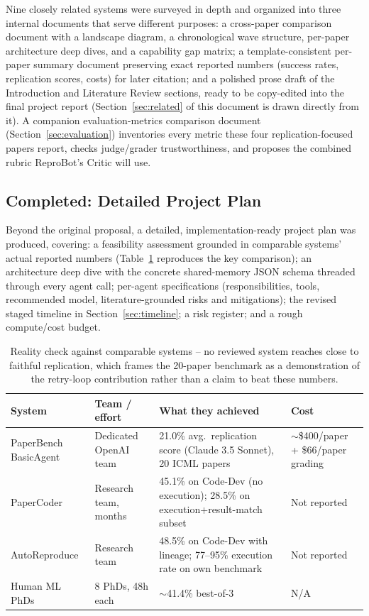 \documentclass[10pt,twocolumn]{article}
\begin{document}
Nine closely related systems were surveyed in depth and organized into three internal
documents that serve different purposes: a cross-paper comparison document with a
landscape diagram, a chronological wave structure, per-paper architecture deep dives,
and a capability gap matrix; a template-consistent per-paper summary document preserving
exact reported numbers (success rates, replication scores, costs) for later citation;
and a polished prose draft of the Introduction and Literature Review sections, ready to
be copy-edited into the final project report (Section~\ref{sec:related} of this document
is drawn directly from it). A companion evaluation-metrics comparison document
(Section~\ref{sec:evaluation}) inventories every metric these four replication-focused
papers report, checks judge/grader trustworthiness, and proposes the combined rubric
ReproBot's Critic will use.

\subsection{Completed: Detailed Project Plan}

Beyond the original proposal, a detailed, implementation-ready project plan was
produced, covering: a feasibility assessment grounded in comparable systems' actual
reported numbers (Table~\ref{tab:reality-check} reproduces the key comparison); an
architecture deep dive with the concrete shared-memory JSON schema threaded through every
agent call; per-agent specifications (responsibilities, tools, recommended model,
literature-grounded risks and mitigations); the revised staged timeline in
Section~\ref{sec:timeline}; a risk register; and a rough compute/cost budget.

\begin{table}[t]
\centering
\small
\begin{tabular}{@{}p{3.2cm}p{4cm}p{4.8cm}p{2.8cm}@{}}
\toprule
\textbf{System} & \textbf{Team / effort} & \textbf{What they achieved} & \textbf{Cost} \\
\midrule
PaperBench BasicAgent & Dedicated OpenAI team & 21.0\% avg.\ replication score
(Claude 3.5 Sonnet), 20 ICML papers & $\sim$\$400/paper + \$66/paper grading \\
PaperCoder & Research team, months & 45.1\% on Code-Dev (no execution); 28.5\% on
execution+result-match subset & Not reported \\
AutoReproduce & Research team & 48.5\% on Code-Dev with lineage; 77--95\% execution rate
on own benchmark & Not reported \\
Human ML PhDs & 8 PhDs, 48h each & $\sim$41.4\% best-of-3 & N/A \\
\bottomrule
\end{tabular}
\caption{Reality check against comparable systems -- no reviewed system reaches close to
faithful replication, which frames the 20-paper benchmark as a demonstration of the
retry-loop contribution rather than a claim to beat these numbers.}
\label{tab:reality-check}
\end{table}
\end{document}
